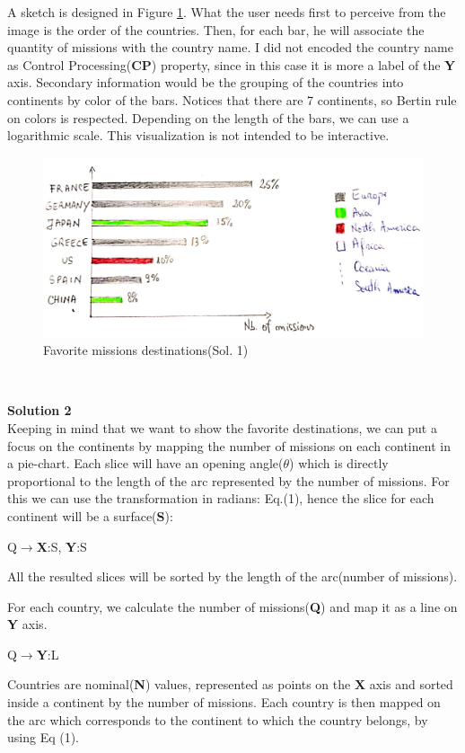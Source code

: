 \documentclass{article}
\begin{document}
A sketch is designed in Figure \ref{fig:fav_dest}. What the user needs first to perceive from the image is the order of the countries. Then, for each bar, he will associate the quantity of missions with the country name. I did not encoded the country name as Control Processing(\textbf{CP}) property, since in this case it is more a label of the \textbf{Y} axis. Secondary information would be the grouping of the countries into continents by color of the bars. Notices that there are 7 continents, so Bertin rule on colors is respected.
Depending on the length of the bars, we can use a logarithmic scale. This visualization is not intended to be interactive.
\begin{figure}[H]
	\centering
	\includegraphics[scale=0.2]{img/4.jpg}
	\caption{Favorite missions destinations(Sol. 1)}
	\label{fig:fav_dest}
\end{figure}\
\newpage

\large{\textbf{Solution 2}}\\
Keeping in mind that we want to show the favorite destinations, we can put a focus on the continents by mapping the number of missions on each continent in a pie-chart. Each slice will have an opening angle($\theta$) which is directly proportional to the length of the arc represented by the number of missions. For this we can use the transformation in radians: Eq.(1), hence the slice for each continent will be a surface(\textbf{S}):

Q$\rightarrow$\textbf{X}:S, \textbf{Y}:S

All the resulted slices will be sorted by the length of the arc(number of missions).


For each country, we calculate the number of missions(\textbf{Q}) and map it as a line on \textbf{Y} axis. 

Q$\rightarrow$\textbf{Y}:L


Countries are nominal(\textbf{N}) values, represented as points on the \textbf{X} axis and sorted inside a continent by the number of missions. Each country is then mapped on the arc which corresponds to the continent to which the country belongs, by using Eq (1). 
\end{document}
